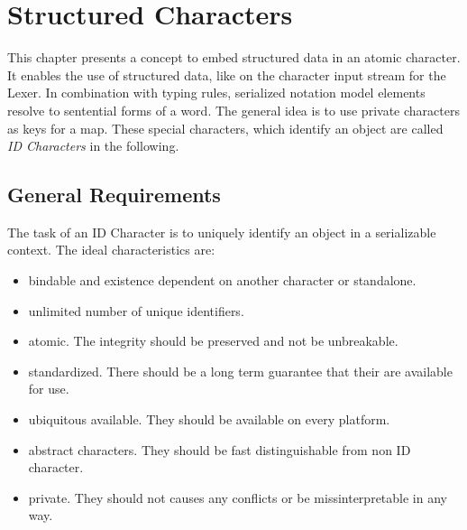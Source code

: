 \chapter{Structured Characters}
This chapter presents a concept to embed structured data in an atomic character. It enables the use of structured data, like  on the character input stream for the Lexer. In combination with typing rules, serialized notation model elements resolve to sentential forms of a word. The general idea is to use private characters as keys for a map. These special characters, which identify an object are called \emph{ID Characters} in the following.

\section{General Requirements}
The task of an ID Character is to uniquely identify an object in a serializable context. 
The ideal characteristics are:
\begin{itemize}
	\item bindable and existence dependent on another character or standalone.
	\item unlimited number of unique identifiers.
	\item atomic. The integrity should be preserved and not be unbreakable.
	\item standardized. There should be a long term guarantee that their are available for use.
	\item ubiquitous available. They should be available on every platform.
	\item abstract characters. They should be fast distinguishable from non ID character.
	\item private. They should not causes any conflicts or be missinterpretable in any way.
\end{itemize}

